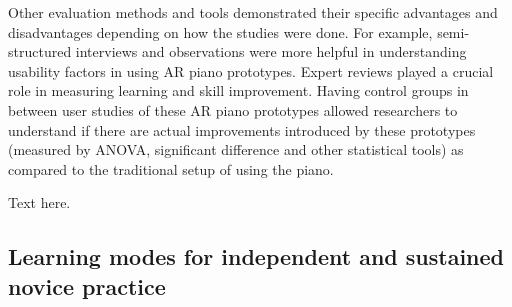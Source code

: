 \documentclass[sigchi, review]{acmart}
\begin{document}
Other evaluation methods and tools demonstrated their specific advantages and disadvantages depending on how the studies were done. For example, semi-structured interviews and observations were more helpful in understanding usability factors in using AR piano prototypes. Expert reviews played a crucial role in measuring learning and skill improvement. Having control groups in between user studies of these AR piano prototypes allowed researchers to understand if there are actual improvements introduced by these prototypes (measured by ANOVA, significant difference and other statistical tools) as compared to the traditional setup of using the piano. 




Text here. 

\subsection{Learning modes for independent and sustained novice practice}
\label{subsec: learn}
\end{document}
